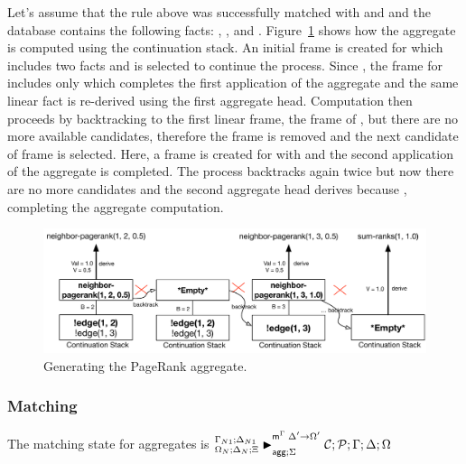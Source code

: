 Let's assume that the rule above was successfully matched with  and
 and the database contains the following facts: , ,  and
. Figure~\ref{fig:logic:backtrack} shows how
the aggregate is computed using the continuation stack. An initial frame is created for
 which includes two  facts and  is selected to continue the process. Since , the frame
for  includes only  which completes the first application of the aggregate and the same
linear fact is re-derived using the first aggregate head. Computation then
proceeds by backtracking to the first linear frame, the frame of
, but there are no more available candidates,
therefore the frame is removed and the next candidate  of
frame  is selected. Here, a frame is created for  with  and the second application of the
aggregate is completed. The process backtracks again twice but now there
are no more candidates and the second aggregate head derives  because , completing the aggregate computation.

\begin{figure}[ht]
   \begin{center}
      \includegraphics[width=0.85\linewidth]{figures/logical_foundations/backtrack.pdf}
   \end{center}
   \caption{Generating the PageRank aggregate.}
   \label{fig:logic:backtrack}
\end{figure}

\subsubsection{Matching}

The matching state for aggregates is 
$\matstatea{\Delta_N}{\lstack{C};
   \lstack{P}}{\Gamma}{\Delta}{\Omega}{\Delta' \rightarrow \Omega'}{\Sigma}$

